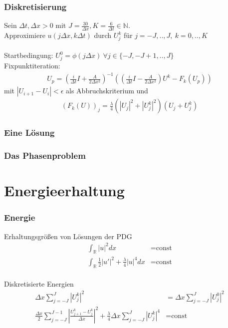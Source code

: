 \documentclass{beamer}
\begin{document}
\begin{frame}
    \frametitle{Diskretisierung}

    Sein $\Delta t, \Delta x>0$ mit $J=\frac{30}{\Delta x},K=\frac{6}{\Delta t}\in\mathbb{N}$.\\
    Approximiere $u(j\Delta x, k\Delta t)$ durch $U_j^k$ f\"ur $j=-J, .. , J,\ k=0, .. , K$\\
    \ \\
    Startbedingung: $U_j^0=\phi(j\Delta x)\ \forall j\in\{-J, -J+1, .., J\}$\\
    Fixpunktiteration:
    \begin{align*}
        U_p = (\frac{i}{\Delta t}I + \frac{A}{2\Delta x^2})^{-1}((\frac{i}{\Delta t}I - \frac{A}{2\Delta x^2})U^k - F_k(U_p))
    \end{align*}
    mit $| U_{i+1}-U_{i} |<\epsilon$ als Abbruchskriterium und
    \begin{align*}
        (F_k(U))_j = \frac{\lambda}{4}(|U_j|^2+|U_j^k|^2)(U_j+U_j^k)
    \end{align*}
\end{frame}

\begin{frame}
    \frametitle{Eine Lösung}


\end{frame}

\begin{frame}
    \frametitle{Das Phasenproblem}


\end{frame}

\section{Energieerhaltung}

\begin{frame}
    \frametitle{Energie}

    Erhaltungsgrößen von Lösungen der PDG
    \begin{align*}
        \int_\mathbb{R} |u|^2 dx &= \text{const}\\
        \int_\mathbb{R} \frac{1}{2}|u'|^2 + \frac{\lambda}{4}|u|^4 dx &= \text{const}
    \end{align*}
    \ \\
    Diskretisierte Energien
    \begin{align*}
        \Delta x \sum_{j=-J}^J |U_j^k|^2 &= \Delta x \sum_{j=-J}^J |U_j^0|^2\\
        \frac{\Delta x}{2} \sum_{j=-J}^{J-1} |\frac{U_{j+1}^k-U_j^k}{\Delta x}|^2+\frac{\lambda}{4}\Delta x \sum_{j=-J}^J |U_j^k|^4 &= \text{const}
    \end{align*}

\end{frame}
\end{document}
